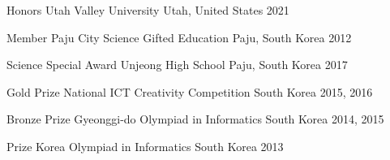 



\begin{cvhonors}

  \cvhonor
    {Honors} %
    {Utah Valley University} %
    {Utah, United States} %
    {2021} %

  \cvhonor
    {Member} %
    {Paju City Science Gifted Education} %
    {Paju, South Korea} %
    {2012} %

\end{cvhonors}




\begin{cvhonors}

  \cvhonor
    {Science Special Award} %
    {Unjeong High School} %
    {Paju, South Korea} %
    {2017} %

  \cvhonor
    {Gold Prize} %
    {National ICT Creativity Competition} %
    {South Korea} %
    {2015, 2016} %

  \cvhonor
    {Bronze Prize} %
    {Gyeonggi-do Olympiad in Informatics} %
    {South Korea} %
    {2014, 2015} %

  \cvhonor
    {Prize} %
    {Korea Olympiad in Informatics} %
    {South Korea} %
    {2013} %

\end{cvhonors}


